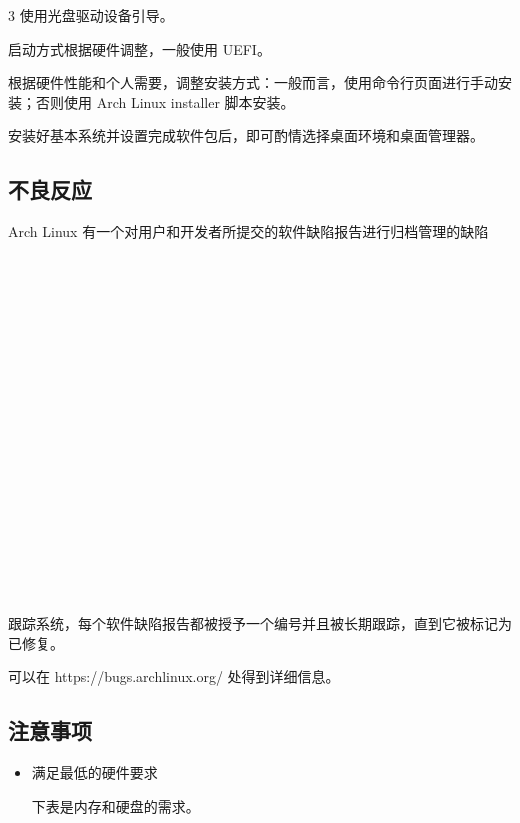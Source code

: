 \documentclass{article}
\begin{document}
\begin{multicols*}{3}
	使用光盘驱动设备引导。

	启动方式根据硬件调整，一般使用 UEFI。

	根据硬件性能和个人需要，调整安装方式：一般而言，使用命令行页面进行手动安装；否则使用 Arch Linux installer 脚本安装。

	安装好基本系统并设置完成软件包后，即可酌情选择桌面环境和桌面管理器。

	\medskip	

	\begin{tcolorbox}
	\section*{不良反应}
	\end{tcolorbox}

	Arch Linux 有一个对用户和开发者所提交的软件缺陷报告进行归档管理的缺陷\\
	\\
	\\
	\\
	\\
	\\
	\\
	\\
	\\
	\\
	\\
	\\
	\\
	\\
	\\
	\\
	\\
	\\
	\\
	\\
	跟踪系统，每个软件缺陷报告都被授予一个编号并且被长期跟踪，直到它被标记为已修复。

	可以在 https://bugs.archlinux.org/ 处得到详细信息。

	\medskip


	\begin{tcolorbox}
	\section*{注意事项}
	\end{tcolorbox}
	\begin{itemize}[leftmargin=*]

		\item 满足最低的硬件要求

		下表是内存和硬盘的需求。


\end{itemize}
\end{multicols*}
\end{document}
